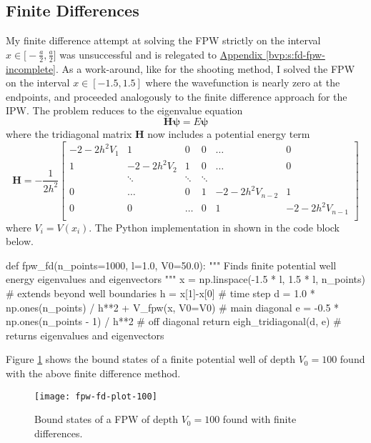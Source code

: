 \documentclass[11pt, a4paper]{article}
\begin{document}
\subsection{Finite Differences}
My finite difference attempt at solving the FPW strictly on the interval $ x \in \big[-\frac{a}{2}, \frac{a}{2}\big] $ was unsuccessful and is relegated to \hyperref[bvp:s:fd-fpw-incomplete]{Appendix \ref{bvp:s:fd-fpw-incomplete}}. As a work-around, like for the shooting method, I solved the FPW on the interval $ x \in [-1.5, 1.5] $ where the wavefunction is nearly zero at the endpoints, and proceeded analogously to the finite difference approach for the IPW. The problem reduces to the eigenvalue equation
\begin{equation*}
	\mathbf{H} \bm{\psi} = E \bm{\psi}
\end{equation*}
where the tridiagonal matrix $ \mathbf{H} $ now includes a potential energy term 
\begin{equation*}
	\mathbf{H} = -\frac{1}{2h^{2}}
	\begin{bmatrix}
		-2 - 2h^{2}V_{1} & 1 & 0 & 0 & \ldots & 0\\
		1 & -2 - 2h^{2}V_{2} & 1 & 0 & \ldots & 0\\
		& \ddots & \ddots & \ddots & &\\
		0 & \ldots & 0 & 1 & -2 - 2h^{2}V_{n-2} & 1\\
		0 & 0 & \ldots & 0 & 1 & -2 - 2h^{2}V_{n-1}\\
	\end{bmatrix}
\end{equation*}
where $ V_{i} = V(x_{i}) $. The Python implementation in shown in the code block below. \\
 
\begin{python}
def fpw_fd(n_points=1000, l=1.0, V0=50.0):
""" Finds finite potential well energy eigenvalues and eigenvectors """
    x = np.linspace(-1.5 * l, 1.5 * l, n_points)  # extends beyond well boundaries
    h = x[1]-x[0]  # time step
    d = 1.0 * np.ones(n_points) / h**2 + V_fpw(x, V0=V0)  # main diagonal
    e = -0.5 * np.ones(n_points - 1) / h**2  # off diagonal
    return eigh_tridiagonal(d, e)  # returns eigenvalues and eigenvectors
\end{python}
Figure \ref{bvp:fig:fpw-fd-plot-100} shows the bound states of a finite potential well of depth $ V_{0} = 100 $ found with the above finite difference method.

\begin{figure}[htb!]
\centering
\texttt{[image: fpw-fd-plot-100]}
\caption{Bound states of a FPW of depth $ V_{0} = 100 $ found with finite differences.}
\vspace{-5mm}
\label{bvp:fig:fpw-fd-plot-100}
\end{figure}
\end{document}
